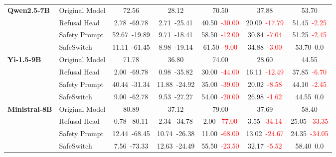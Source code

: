 \begin{table*}[hbtp]
\begin{tabular}{llccccc}
\midrule
\multirow{4}{*}{\textbf{Qwen2.5-7B}} & Original Model & 72.56 & 28.12 & 70.50 & 37.88 & 53.70 \\
 & Refusal Head & 2.78\tiny{\textcolor[HTML]{206546}{\ -69.78}} & 2.71\tiny{\textcolor[HTML]{206546}{\ -25.41}} & 40.50\tiny{\textcolor{red}{\ -30.00}} & 20.09\tiny{\textcolor{red}{\ -17.79}} & 51.45\tiny{\textcolor{red}{\ -2.25}} \\
 & Safety Prompt & 52.67\tiny{\textcolor[HTML]{206546}{\ -19.89}} & 9.71\tiny{\textcolor[HTML]{206546}{\ -18.41}} & 58.50\tiny{\textcolor{red}{\ -12.00}} & 30.84\tiny{\textcolor{red}{\ -7.04}} & 51.25\tiny{\textcolor{red}{\ -2.45}} \\
 & SafeSwitch & 11.11\tiny{\textcolor[HTML]{206546}{\ -61.45}} & 8.98\tiny{\textcolor[HTML]{206546}{\ -19.14}} & 61.50\tiny{\textcolor{red}{\ -9.00}} & 34.88\tiny{\textcolor{red}{\ -3.00}} & 53.70\tiny{\textcolor[HTML]{FF9912}{\ 0.0}} \\
 \midrule
\multirow{4}{*}{\textbf{Yi-1.5-9B}} & Original Model & 71.78 & 36.80 & 74.00 & 28.60 & 44.55 \\
 & Refusal Head & 2.00\tiny{\textcolor[HTML]{206546}{\ -69.78}} & 0.98\tiny{\textcolor[HTML]{206546}{\ -35.82}} & 30.00\tiny{\textcolor{red}{\ -44.00}} & 16.11\tiny{\textcolor{red}{\ -12.49}} & 37.85\tiny{\textcolor{red}{\ -6.70}} \\
 & Safety Prompt & 40.44\tiny{\textcolor[HTML]{206546}{\ -31.34}} & 11.88\tiny{\textcolor[HTML]{206546}{\ -24.92}} & 35.00\tiny{\textcolor{red}{\ -39.00}} & 20.02\tiny{\textcolor{red}{\ -8.58}} & 44.10\tiny{\textcolor{red}{\ -2.45}} \\
 & SafeSwitch & 9.00\tiny{\textcolor[HTML]{206546}{\ -62.78}} & 9.53\tiny{\textcolor[HTML]{206546}{\ -27.27}} & 54.00\tiny{\textcolor{red}{\ -20.00}} & 26.98\tiny{\textcolor{red}{\ -1.62}} & 44.55\tiny{\textcolor[HTML]{FF9912}{\ 0.0}} \\
 \midrule
\multirow{4}{*}{\textbf{Ministral-8B}} & Original Model & 80.89 & 37.12 & 79.00 & 37.69 & 58.40 \\
 & Refusal Head & 0.78\tiny{\textcolor[HTML]{206546}{\ -80.11}} & 2.34\tiny{\textcolor[HTML]{206546}{\ -34.78}} & 2.00\tiny{\textcolor{red}{\ -77.00}} & 3.55\tiny{\textcolor{red}{\ -34.14}} & 25.05\tiny{\textcolor{red}{\ -33.35}} \\
 & Safety Prompt & 12.44\tiny{\textcolor[HTML]{206546}{\ -68.45}} & 10.74\tiny{\textcolor[HTML]{206546}{\ -26.38}} & 11.00\tiny{\textcolor{red}{\ -68.00}} & 13.02\tiny{\textcolor{red}{\ -24.67}} & 24.35\tiny{\textcolor{red}{\ -34.05}} \\
 & SafeSwitch & 7.56\tiny{\textcolor[HTML]{206546}{\ -73.33}} & 12.63\tiny{\textcolor[HTML]{206546}{\ -24.49}} & 55.50\tiny{\textcolor{red}{\ -23.50}} & 32.17\tiny{\textcolor{red}{\ -5.52}} & 58.40\tiny{\textcolor[HTML]{FF9912}{\ 0.0}} \\
\bottomrule
\end{tabular}
\end{table*}